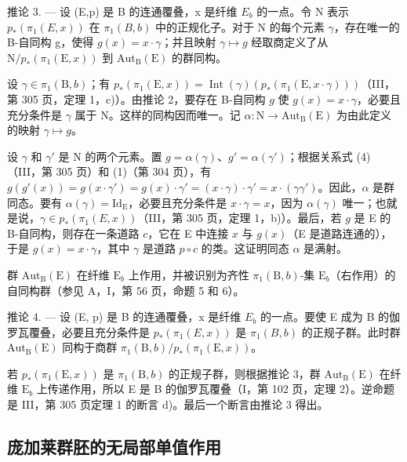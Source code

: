 推论 3. --- 设 (E,p) 是 B 的连通覆叠，x 是纤维 \(E_{b}\) 的一点。令 N 表示 \(p_{*}(\pi_{1}(E,x))\) 在 \(\pi_{1}(B,b)\) 中的正规化子。对于 N 的每个元素 \(\gamma\)，存在唯一的 B-自同构 g，使得 \(g(x) = x \cdot \gamma\)；并且映射 \(\gamma \mapsto g\) 经取商定义了从 \(\mathrm{N}/p_{*}(\pi_{1}(\mathrm{E},x))\) 到 \(\mathrm{Aut}_{\mathrm{B}}(\mathrm{E})\) 的群同构。

设 \(\gamma \in \pi_1(\mathrm{B}, b)\)；有 \(p_*(\pi_1(\mathrm{E}, x)) = \operatorname{Int}(\gamma)(p_*(\pi_1(\mathrm{E}, x \cdot \gamma)))\)（III，第 305 页，定理 1，c)）。由推论 2，要存在 B-自同构 \(g\) 使 \(g(x) = x \cdot \gamma\)，必要且充分条件是 \(\gamma\) 属于 N。这样的同构因而唯一。记 \(\alpha: \mathrm{N} \to \mathrm{Aut}_{\mathrm{B}}(\mathrm{E})\) 为由此定义的映射 \(\gamma \mapsto g\)。

设 \(\gamma\) 和 \(\gamma'\) 是 N 的两个元素。置 \(g = \alpha(\gamma)\)、\(g' = \alpha(\gamma')\)；根据关系式 (4)（III，第 305 页）和 (1)（第 304 页），有 \(g(g'(x)) = g(x \cdot \gamma') = g(x) \cdot \gamma' = (x \cdot \gamma) \cdot \gamma' = x \cdot (\gamma\gamma')\)。因此，\(\alpha\) 是群同态。要有 \(\alpha(\gamma) = \mathrm{Id}_{\mathrm{E}}\)，必要且充分条件是 \(x \cdot \gamma = x\)，因为 \(\alpha(\gamma)\) 唯一；也就是说，\(\gamma \in p_*(\pi_1(E, x))\)（III，第 305 页，定理 1，b)）。最后，若 \(g\) 是 E 的 B-自同构，则存在一条道路 \(c\)，它在 E 中连接 \(x\) 与 \(g(x)\)（E 是道路连通的），于是 \(g(x) = x \cdot \gamma\)，其中 \(\gamma\) 是道路 \(p \circ c\) 的类。这证明同态 \(\alpha\) 是满射。

群 \(\mathrm{Aut}_{\mathrm{B}}(\mathrm{E})\) 在纤维 \(\mathrm{E}_b\) 上作用，并被识别为齐性 \(\pi_1(\mathrm{B},b)\)-集 \(\mathrm{E}_b\)（右作用）的自同构群（参见 A，I，第 56 页，命题 5 和 6）。

推论 4. --- 设 (E, p) 是 B 的连通覆叠，x 是纤维 \(E_{b}\) 的一点。要使 E 成为 B 的伽罗瓦覆叠，必要且充分条件是 \(p_{*}(\pi_{1}(E, x))\) 是 \(\pi_{1}(B, b)\) 的正规子群。此时群 \(\mathrm{Aut}_{\mathrm{B}}(\mathrm{E})\) 同构于商群 \(\pi_{1}(\mathrm{B}, b)/p_{*}(\pi_{1}(\mathrm{E}, x))\)。

若 \(p_{*}(\pi_{1}(\mathrm{E},x))\) 是 \(\pi_1(\mathrm{B},b)\) 的正规子群，则根据推论 3，群 \(\mathrm{Aut}_{\mathrm{B}}(\mathrm{E})\) 在纤维 \(\mathrm{E}_b\) 上传递作用，所以 E 是 B 的伽罗瓦覆叠（I，第 102 页，定理 2）。逆命题是 III，第 305 页定理 1 的断言 d)。最后一个断言由推论 3 得出。

\subsection{庞加莱群胚的无局部单值作用}

